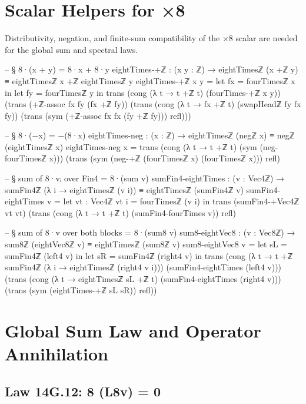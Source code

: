 \documentclass[11pt,a4paper]{book}
\def\Sigma{Sigma}%
\def\texorpdfstring#1#2{#2}%
\begin{document}
\section{Scalar Helpers for ×8}

Distributivity, negation, and finite-sum compatibility of the $\times 8$
scalar are needed for the global sum and spectral laws.

\begin{code}
-- § 8·(x + y) = 8·x + 8·y
eightTimes-+ℤ : (x y : ℤ) → eightTimesℤ (x +ℤ y) ≡ eightTimesℤ x +ℤ eightTimesℤ y
eightTimes-+ℤ x y =
  let fx = fourTimesℤ x in
  let fy = fourTimesℤ y in
  trans
    (cong (λ t → t +ℤ t) (fourTimes-+ℤ x y))
    (trans
      (+ℤ-assoc fx fy (fx +ℤ fy))
      (trans
        (cong (λ t → fx +ℤ t) (swapHeadℤ fy fx fy))
        (trans
          (sym (+ℤ-assoc fx fx (fy +ℤ fy)))
          refl)))

-- § 8·(−x) = −(8·x)
eightTimes-neg : (x : ℤ) → eightTimesℤ (negℤ x) ≡ negℤ (eightTimesℤ x)
eightTimes-neg x =
  trans
    (cong (λ t → t +ℤ t) (sym (neg-fourTimesℤ x)))
    (trans
      (sym (neg-+ℤ (fourTimesℤ x) (fourTimesℤ x)))
      refl)

-- § sum of 8·vᵢ over Fin4 = 8·(sum v)
sumFin4-eightTimes : (v : Vec4ℤ) →
  sumFin4ℤ (λ i → eightTimesℤ (v i)) ≡ eightTimesℤ (sumFin4ℤ v)
sumFin4-eightTimes v =
  let vt : Vec4ℤ
      vt i = fourTimesℤ (v i)
  in
  trans
    (sumFin4-+Vec4ℤ vt vt)
    (trans
      (cong (λ t → t +ℤ t) (sumFin4-fourTimes v))
      refl)

-- § sum of 8·v over both blocks = 8·(sum8 v)
sum8-eightVec8 : (v : Vec8ℤ) → sum8ℤ (eightVec8ℤ v) ≡ eightTimesℤ (sum8ℤ v)
sum8-eightVec8 v =
  let sL = sumFin4ℤ (left4 v) in
  let sR = sumFin4ℤ (right4 v) in
  trans
    (cong
      (λ t → t +ℤ sumFin4ℤ (λ i → eightTimesℤ (right4 v i)))
      (sumFin4-eightTimes (left4 v)))
    (trans
      (cong
        (λ t → eightTimesℤ sL +ℤ t)
        (sumFin4-eightTimes (right4 v)))
      (trans
        (sym (eightTimes-+ℤ sL sR))
        refl))
\end{code}

\section{Global Sum Law and Operator Annihilation}

\subsection{Law 14G.12: \texorpdfstring{$\Sigma_8 (L_8\,v) = 0$}{8 (L8v) = 0}}
\end{document}
